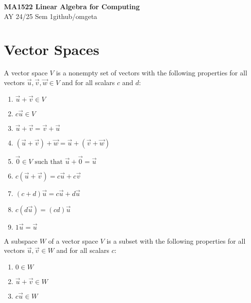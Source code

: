 \documentclass[12pt, a4paper]{article}
\newcommand{\mytitle}{MA1522 Linear Algebra for Computing}
\newcommand{\myauthor}{github/omgeta}
\newcommand{\mydate}{AY 24/25 Sem 1}
\begin{document}
\raggedright
\footnotesize
\begin{multicols*}{3}
\setlength{\premulticols}{1pt}
\setlength{\postmulticols}{1pt}
\setlength{\multicolsep}{1pt}
\setlength{\columnsep}{1pt}

{\normalsize{\textbf{\mytitle}}} \\
{\footnotesize{\mydate\hspace{2pt}\textemdash\hspace{2pt}\myauthor}}
\vspace{-1em}
\section{Vector Spaces}
A vector space $V$ is a nonempty set of vectors with the following properties for all vectors $\vec{u}, \vec{v}, \vec{w} \in V$ and for all scalars $c$ and $d$:
\begin{enumerate}[\roman*.]
  \item $\vec{u} + \vec{v} \in V$
  \item $c\vec{u} \in V$
  \item $\vec{u} + \vec{v} = \vec{v} + \vec{u}$
  \item $(\vec{u} + \vec{v}) + \vec{w} = \vec{u} + (\vec{v} + \vec{w})$
  \item $\vec{0} \in V \text{ such that } \vec{u} + \vec{0} = \vec{u}$
  \item $c(\vec{u} + \vec{v}) = c\vec{u} + c\vec{v}$
  \item $(c + d)\vec{u} = c\vec{u} + d\vec{u}$
  \item $c(d\vec{u}) = (cd)\vec{u}$ 
  \item $1\vec{u} = \vec{u}$
\end{enumerate}

A subspace $W$ of a vector space $V$ is a subset with the following properties for all vectors $\vec{u}, \vec{v} \in W$ and for all scalars $c$:
\begin{enumerate}[\roman*.]
  \item $0 \in W$
  \item $\vec{u} + \vec{v} \in W$
  \item $c\vec{u} \in W$\
\end{enumerate}


\end{multicols*}
\end{document}
